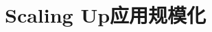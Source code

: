 \documentclass[oneside]{book}
\begin{document}
% 
% 
% 
% 
% 
% 
% 
%  
% 
% 
% 
%  
%  
%  
%  
%  
% 
% 
% 
% 
% 
% 
% 
% 

% 
% 

\chapter{Scaling Up\hfill 应用规模化}
\end{document}
